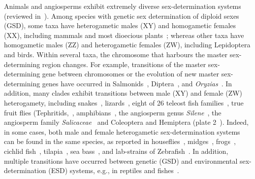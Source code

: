 \documentclass[10pt,letterpaper]{article}
\begin{document}
Animals and angiosperms exhibit extremely diverse sex-determination systems (reviewed in~\cite{Bull:1983vi,Charlesworth:2010it,Beukeboom:2014vb,Bachtrog:2014bx}). 
Among species with genetic sex determination of diploid sexes (GSD), some taxa have heterogametic males (XY) and homogametic females (XX), including %
mammals and most dioecious plants~\cite{Ming:2011iy}; whereas other taxa have homogametic males (ZZ) and heterogametic females (ZW), including Lepidoptera and birds. 
Within several taxa, the chromosome that harbours the master sex-determining region changes. 
For example, transitions of the master sex-determining gene between chromosomes or the evolution of new master sex-determining genes have occurred in Salmonids~\cite{Li:2011fm,Yano:2012di}, Diptera~\cite{Vicoso:2015hf}, and \textit{Oryzias}~\cite{Myosho:2012fv}.
In addition, many clades exhibit transitions between male (XY) and female (ZW) heterogamety, including snakes~\cite{Gamble2017}, lizards~\cite{Ezaz:2009tk}, eight of 26 teleost fish families~\cite{Mank:2006bt}, true fruit flies (Tephritids,~\cite{Vicoso:2015hf}, amphibians~\cite{Hillis:1990gu}, the angiosperm genus \textit{Silene}~\cite{Slancarova:2013dq}, the angiosperm family \textit{Salicaceae}~\cite{Pucholt2015,Pucholt2017} and Coleoptera and Hemiptera (plate 2~\cite{Beukeboom:2014vb}).
Indeed, in some cases, both male and female heterogametic sex-determination systems can be found in the same species, as reported in houseflies~\cite{Macdonald1978}, midges~\cite{Thompson1971}, frogs~\cite{Ogata:2007jm}, cichlid fish~\cite{Ser:2010iq}, tilapia~\cite{Lee2004}, sea bass~\cite{Vandeputte2007}, and lab-strains of Zebrafish~\cite{Liew2012,Wilson2014}.
In addition, multiple transitions have occurred between genetic (GSD) and environmental sex-determination (ESD) systems, e.g., in reptiles and fishes~\cite{Conover:1987in,Mank:2006bt,Pokorna:2009ui,Ezaz:2009tk,Pen:2010kk,Holleley:2015hc}.
\end{document}
